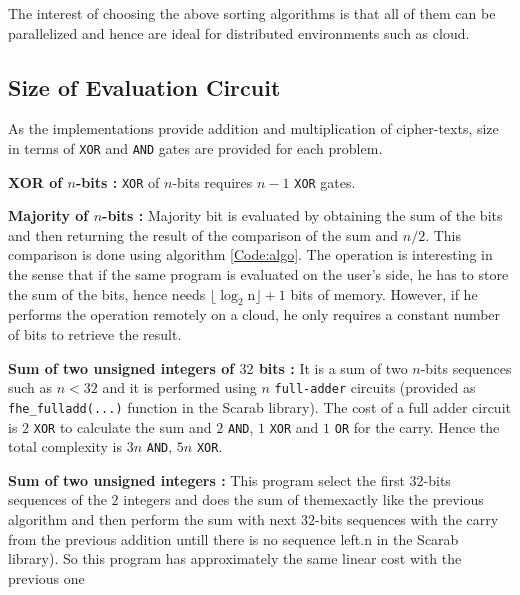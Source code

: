 \documentclass{acm_proc_article-sp}
\begin{document}
The interest of choosing the above sorting algorithms is that all of them can be parallelized and hence are ideal for distributed environments such as cloud. 

\subsection{Size of Evaluation Circuit}
As the implementations provide addition and multiplication of cipher-texts,  size in terms of \texttt{XOR} and \texttt{AND} gates are provided for each problem. 

\textbf{XOR of $n$-bits :} \texttt{XOR} of $n$-bits requires $n-1$ \texttt{XOR} gates. \newline \newline

\textbf{Majority of $n$-bits :} Majority bit is evaluated by obtaining the sum of the bits and then returning the result of the comparison of the sum and $n/2$. This comparison is done using algorithm \autoref{Code:algo}. The operation is interesting in the sense that if the same program is evaluated on the user's side, he has to store the sum of the bits, hence  needs $\mathrm{\lfloor\log_{2}n \rfloor +1}$ bits of memory. However, if he performs the operation remotely on a cloud, he only requires a constant number of bits to retrieve the result. \newline \newline

\textbf{Sum of two unsigned integers of $32$ bits :} It is a sum of two $n$-bits sequences such as $n<32$ and it is performed using $n$ \texttt{full-adder} circuits (provided as \texttt{fhe\_fulladd(...)} function in the Scarab library). The cost of a full adder circuit is $2$ \texttt{XOR} to calculate the sum and $2$ \texttt{AND}, $1$ \texttt{XOR} and $1$ \texttt{OR} for the carry. Hence the total complexity is $3n$ \texttt{AND}, $5n$ \texttt{XOR}. \newline \newline

\textbf{Sum of two unsigned integers :} This program select the first $32$-bits sequences of the $2$ integers and does the sum of themexactly like the previous algorithm and then perform the sum with next $32$-bits sequences with the carry from the previous addition untill there is no sequence left.n in the Scarab library). So this program has approximately the same linear cost with the previous one \newline \newline
\end{document}
